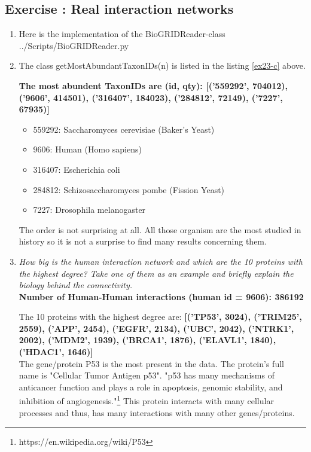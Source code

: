 \documentclass[10pt,a4paper]{article}
\newcommand{\exercise}[1]
{
  \stepcounter{subsection}
  \subsection*{Exercise \thesubsection: #1}

}
\begin{document}
\newpage
\exercise{Real interaction networks}
\begin{enumerate}
	\item Here is the implementation of the BioGRIDReader-class
	 {../Scripts/BioGRIDReader.py}
	
	
	
	\newpage
	\item The class getMostAbundantTaxonIDs(n) is listed in the listing \ref{ex23-c} above. 
	
	\textbf{The most abundent TaxonIDs are (id, qty):  [('559292', 704012), ('9606', 414501), ('316407', 184023), ('284812', 72149), ('7227', 67935)]}
	
	\begin{itemize}
		\item 559292: Saccharomyces cerevisiae (Baker's Yeast)
		\item   9606: Human (Homo sapiens) 
		\item 316407: Escherichia coli
		\item 284812: Schizosaccharomyces pombe (Fission Yeast)
		\item   7227: Drosophila melanogaster
	\end{itemize}
	
	The order is not surprising at all. All those organism are the most studied in history so it is not a surprise to find many results concerning them. 
	
	
	\item \textit{How big is the human interaction network and which are the 10 proteins with the highest
		degree? Take one of them as an example and briefly explain the biology behind the
		connectivity.}\\
	
	
	
	
	\textbf{Number of Human-Human interactions (human id = 9606):  386192}
	
	The  10  proteins with the highest degree are: 
	\textbf{[('TP53', 3024), ('TRIM25', 2559), ('APP', 2454), ('EGFR', 2134), ('UBC', 2042), ('NTRK1', 2002), ('MDM2', 1939), ('BRCA1', 1876), ('ELAVL1', 1840), ('HDAC1', 1646)]}\\
	
	
	The gene/protein P53 is the most present in the data. The protein's full name is "Cellular Tumor Antigen p53". "p53 has many mechanisms of anticancer function and plays a role in apoptosis, genomic stability, and inhibition of angiogenesis."\footnote{https://en.wikipedia.org/wiki/P53} This protein interacts with many cellular processes and thus, has many interactions with many other genes/proteins. 
	

\end{enumerate}
\end{document}
